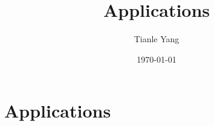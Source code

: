 \documentclass[sectionlevel=section,status=draft]{noteformyself}
\title{Applications}
\author{Tianle Yang}
\date{\today}
\begin{document}
    \maketitle

    \section[
      status=draft,
      tag=00000,
      label=\labelNFM{sec:p-adic-method:applications}
    ]{Applications}



\end{document}
